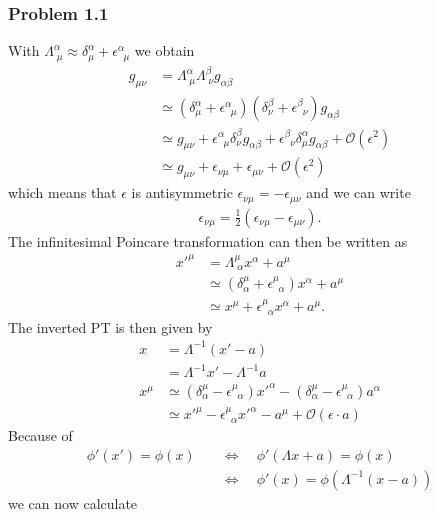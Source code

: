 \documentclass[10pt,a4paper]{article}
\theoremstyle{definition}
\begin{document}
\subsubsection{Problem 1.1}
With $\Lambda^\alpha_{\;\mu}\approx\delta^\alpha_\mu+\epsilon^\alpha_{\;\;\mu}$ we obtain
\begin{align}
g_{\mu\nu}
&=\Lambda^\alpha_{\;\mu}\Lambda^\beta_{\;\nu}g_{\alpha\beta}\\
&\simeq\left(\delta^\alpha_\mu+\epsilon^\alpha_{\;\;\mu}\right)\left(\delta^\beta_\nu+\epsilon^\beta_{\;\;\nu}\right)g_{\alpha\beta}\\
&\simeq g_{\mu\nu}+\epsilon^\alpha_{\;\;\mu}\delta^\beta_\nu g_{\alpha\beta}+\epsilon^\beta_{\;\;\nu}\delta^\alpha_\mu g_{\alpha\beta}+\mathcal{O}(\epsilon^2)\\
&\simeq g_{\mu\nu}+\epsilon_{\nu\mu}+\epsilon_{\mu\nu}+\mathcal{O}(\epsilon^2)
\end{align}
which means that $\epsilon$ is antisymmetric $\epsilon_{\nu\mu}=-\epsilon_{\mu\nu}$ and we can write
\begin{align}
\epsilon_{\nu\mu}=\frac{1}{2}\left(\epsilon_{\nu\mu}-\epsilon_{\mu\nu}\right).
\end{align}
The infinitesimal Poincare transformation can then be written as
\begin{align}
x'^\mu
&=\Lambda^\mu_{\;\alpha}x^\alpha+a^\mu\\
&\simeq\left(\delta^\mu_\alpha+\epsilon^\mu_{\;\;\alpha}\right)x^\alpha+a^\mu\\
&\simeq x^\mu+\epsilon^\mu_{\;\;\alpha}x^\alpha+a^\mu.
\end{align}
The inverted PT is then given by
\begin{align}
x&=\Lambda^{-1}(x'-a)\\
&=\Lambda^{-1}x'-\Lambda^{-1}a\\
x^\mu&\simeq\left(\delta^\mu_\alpha-\epsilon^\mu_{\;\;\alpha}\right)x'^\alpha-\left(\delta^\mu_\alpha-\epsilon^\mu_{\;\;\alpha}\right)a^\alpha\\
&\simeq x'^\mu-\epsilon^\mu_{\;\;\alpha}x'^\alpha-a^\mu+\mathcal{O}(\epsilon\cdot a)
\end{align}
Because of 
\begin{align}
\phi'(x')=\phi(x)
&\quad\Leftrightarrow\quad\phi'(\Lambda x+a)=\phi(x)\\
&\quad\Leftrightarrow\quad\phi'(x)=\phi(\Lambda^{-1}(x-a))
\end{align}
we can now calculate 
\end{document}
